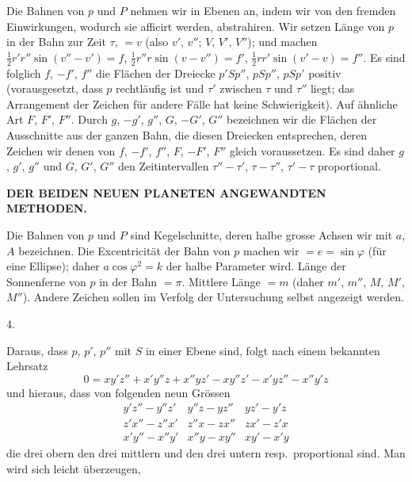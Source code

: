 Die Bahnen von $p$ und $P$ nehmen wir in Ebenen an, indem wir von den fremden Einwirkungen, wodurch sie afficirt werden, abstrahiren. Wir setzen Länge von $p$ in der Bahn zur Zeit $\tau$, $=v$ (also $v'$, $v''$; $V$, $V'$, $V''$); und machen $\frac12r'r''\sin(v''-v')=f$, $\frac12r''r\sin(v-v'')=f'$, $\frac12rr'\sin(v'-v)=f''$. Es sind folglich $f$, $-f'$, $f''$ die Flächen der Dreiecke $p'Sp''$, $pSp''$, $pSp'$ positiv (vorausgesetzt, dass $p$ rechtläufig ist und $\tau'$ zwischen $\tau$ und $\tau''$ liegt; das Arrangement der Zeichen für andere Fälle hat keine Schwierigkeit). Auf ähnliche Art $F$, $F'$, $F''$. Durch $g$, $-g'$, $g''$, $G$, $-G'$, $G''$ bezeichnen wir die Flächen der Ausschnitte aus der ganzen Bahn, die diesen Dreiecken entsprechen, deren Zeichen wir denen von $f$, $-f'$, $f''$, $F$, $-F'$, $F''$ gleich voraussetzen. Es sind daher $g$, $g'$, $g''$ und $G$, $G'$, $G''$ den Zeitintervallen $\tau''-\tau'$, $\tau-\tau''$, $\tau'-\tau$ proportional.

\clearpage
\thispagestyle{empty}
\noindent{}%
\makebox[12mm][l]{}%
\parbox[t]{\dimexpr\linewidth-24mm\relax}{\centering\fontsize{7.4}{9.2}\selectfont\bfseries DER BEIDEN NEUEN PLANETEN ANGEWANDTEN METHODEN.\par}%
\par\nobreak\smallskip
\indent Die Bahnen von $p$ und $P$ sind Kegelschnitte, deren halbe grosse Achsen wir mit $a$, $A$ bezeichnen. Die Excentricität der Bahn von $p$ machen wir $=e=\sin\varphi$ (für eine Ellipse); daher $a\cos\varphi^2=k$ der halbe Parameter wird. Länge der Sonnenferne von $p$ in der Bahn $=\pi$. Mittlere Länge $=m$ (daher $m'$, $m''$, $M$, $M'$, $M''$). Andere Zeichen sollen im Verfolg der Untersuchung selbst angezeigt werden.

\begin{center}4.\end{center}
\par\indent Daraus, dass $p$, $p'$, $p''$ mit $S$ in einer Ebene sind, folgt nach einem bekannten Lehrsatz
\[
0=xy'z''+x'y''z+x''yz'-xy''z'-x'yz''-x''y'z
\]
und hieraus, dass von folgenden neun Grössen
\[
\begin{array}{ccc}
y'z''-y''z'&y''z-yz''&yz'-y'z\\
z'x''-z''x'&z''x-zx''&zx'-z'x\\
x'y''-x''y'&x''y-xy''&xy'-x'y
\end{array}
\]
die drei obern den drei mittlern und den drei untern resp.\ proportional sind. Man wird sich leicht überzeugen,

